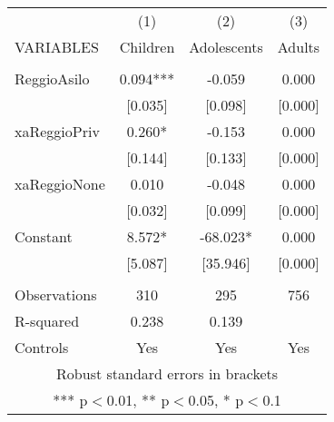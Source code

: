 \begin{tabular}{lccc} \hline
 & (1) & (2) & (3) \\
VARIABLES & Children & Adolescents & Adults \\ \hline
 &  &  &  \\
ReggioAsilo & 0.094*** & -0.059 & 0.000 \\
 & [0.035] & [0.098] & [0.000] \\
xaReggioPriv & 0.260* & -0.153 & 0.000 \\
 & [0.144] & [0.133] & [0.000] \\
xaReggioNone & 0.010 & -0.048 & 0.000 \\
 & [0.032] & [0.099] & [0.000] \\
Constant & 8.572* & -68.023* & 0.000 \\
 & [5.087] & [35.946] & [0.000] \\
 &  &  &  \\
Observations & 310 & 295 & 756 \\
R-squared & 0.238 & 0.139 &  \\
 Controls & Yes & Yes & Yes \\ \hline
\multicolumn{4}{c}{ Robust standard errors in brackets} \\
\multicolumn{4}{c}{ *** p$<$0.01, ** p$<$0.05, * p$<$0.1} \\
\end{tabular}
